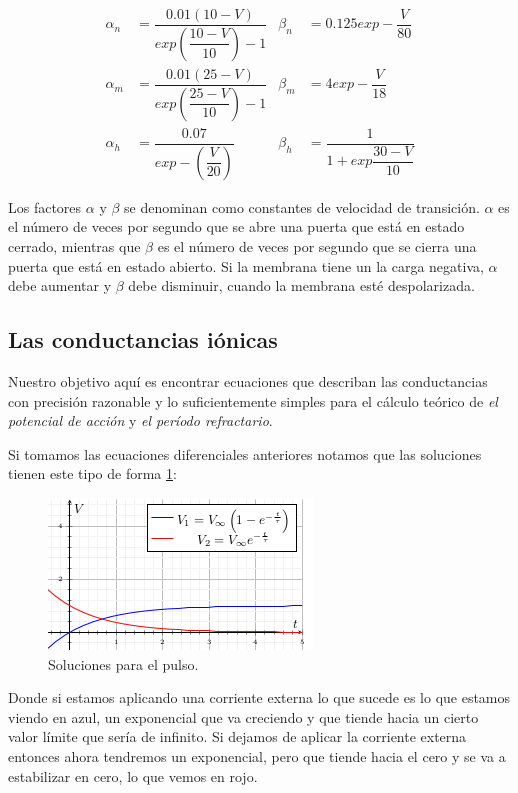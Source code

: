 \begin{align*}
\alpha_{n}&=\dfrac{0.01(10-V)}{exp(\dfrac{10-V}{10})-1}           &  \beta_{n}&=0.125exp-\dfrac{V}{80}\\
\alpha_{m}&=\dfrac{0.01(25-V)}{exp(\dfrac{25-V}{10})-1}                    &  \beta_{m}&=4exp-\dfrac{V}{18}\\
\alpha_{h}&=\dfrac{0.07}{exp-(\dfrac{V}{20})}              &  \beta_{h}&=\dfrac{1}{1+exp\dfrac{30-V}{10}}
\end{align*}

Los factores \(\alpha\) y \(\beta\) se denominan como constantes de velocidad de transición. \(\alpha\) es el número de veces por segundo que se abre una puerta que está en estado cerrado, mientras que \(\beta\) es el número de veces por segundo que se cierra una puerta que está en estado abierto. Si la membrana tiene un la carga negativa, \(\alpha\) debe aumentar y \(\beta\) debe disminuir, cuando la membrana esté despolarizada.


\subsection{Las conductancias iónicas}
Nuestro objetivo aquí es encontrar ecuaciones que describan las conductancias con precisión razonable y lo suficientemente simples para el cálculo teórico de \emph{el potencial de acción} y \emph{el período refractario}. 

Si tomamos las ecuaciones diferenciales anteriores notamos que las soluciones tienen este tipo de forma \ref{fig:graficaX}:

\begin{figure}[h]
 \centering
 \includegraphics[scale=0.8]{../Figuras/solPulso1.png}
 \caption{Soluciones para el pulso.}
 \label{fig:graficaX}
\end{figure}


Donde si estamos aplicando una corriente externa lo que sucede es lo que estamos viendo en azul, un exponencial que va creciendo y que tiende hacia un cierto valor límite que sería de infinito. Si dejamos de aplicar la corriente externa entonces ahora tendremos un exponencial, pero que tiende hacia el cero y se va a estabilizar en cero, lo que vemos en rojo. 

